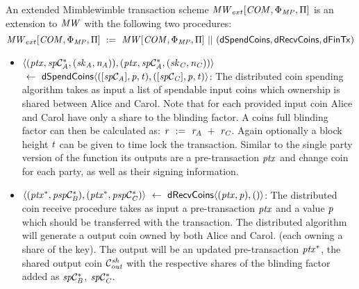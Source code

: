 \begin{definition}
    \label{def:atom:ext-mw-tx-scheme}
    An extended Mimblewimble transaction scheme $\mathit{MW}_{ext}[\mathit{COM},\Phi_{\mathit{MP}},\Pi]$ is an extension to $\mathit{MW}$ with the following two  procedures:
    \[ \mathit{MW}_{ext}[\mathit{COM},\Phi_{\mathit{MP}},\Pi] ~:=~ \mathit{MW}[\mathit{COM},\Phi_{\mathit{MP}},\Pi] ~||~ (\mathsf{dSpendCoins}, \mathsf{dRecvCoins}, \mathsf{dFinTx}) \]
    \begin{itemize}
        \item $\langle (\mathit{ptx}, \mathit{sp}\mathcal{C}_{\mathit{A}}^*, (\mathit{sk}_{\mathit{A}},\mathit{\mathit{n}_{\mathit{A}}})), (\mathit{ptx}, \mathit{sp}\mathcal{C}_{\mathit{A}}^*, (\mathit{sk}_{\mathit{C}},\mathit{\mathit{n}_{\mathit{C}}})) \rangle$ \\
        $~\leftarrow~ \mathsf{dSpendCoins} \langle ([\mathit{sp}\mathcal{C}_{\mathit{A}}],\mathit{p},\mathit{t}), ([\mathit{sp}\mathcal{C}_{\mathit{C}}],\mathit{p},\mathit{t}) \rangle$:
        The distributed coin spending algorithm takes as input a list of spendable input coins which ownership is shared between Alice and Carol.
        Note that for each provided input coin Alice and Carol have only a share to the blinding factor. 
        A coins full blinding factor can then be calculated as:
        $\mathit{r} ~:=~ \mathit{r}_{\mathit{A}} ~+~ \mathit{r}_{\mathit{C}}$. 
        Again optionally a block height $\mathit{t}$ can be given to time lock the transaction.
        Similar to the single party version of the function its outputs are a pre-transaction $\mathit{ptx}$ and change coin for each party, as well as their signing information.
        \item $\langle (\mathit{ptx}^*, \mathit{psp}\mathcal{C}_{\mathit{B}}^*), (\mathit{ptx}^*, \mathit{psp}\mathcal{C}_{\mathit{C}}^*) \rangle ~\leftarrow~ \mathsf{dRecvCoins} \langle(\mathit{ptx},\mathit{p}), () \rangle$: The distributed coin receive procedure takes as input a pre-transaction $\mathit{ptx}$ and a value $\mathit{p}$ which should be transferred with the transaction.
        The distributed algorithm will generate a output coin owned by both Alice  and Carol. (each owning a share of the key).
        The output will be an updated pre-transaction $\mathit{ptx}^*$, the shared output coin $\mathcal{C}_{\mathit{out}}^{\mathit{sh}}$  with the respective shares of the blinding factor added as $\mathit{sp}\mathcal{C}_{\mathit{B}}^*$, $\mathit{sp}\mathcal{C}_{\mathit{C}}^*$.

\end{itemize}
\end{definition}
